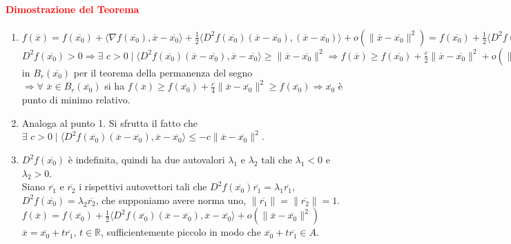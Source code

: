 \documentclass{article}
\newcommand{\R}{\mathbb{R}}
\begin{document}
\paragraph{\textcolor{red}{Dimostrazione del Teorema}}
\begin{enumerate}
    \item $f(\overline{x})=f(\overline{x_0})+\langle \nabla f(\overline{x_0}), \overline{x}-\overline{x_0} \rangle+\frac{1}{2}\langle D^2f(\overline{x_0})(\overline{x}-\overline{x_0}),(\overline{x}-\overline{x_0}) \rangle+o(\| \overline{x}-\overline{x_0} \|^2)=f(\overline{x_0})+\frac{1}{2}\langle D^2f(\overline{x_0})(\overline{x}-\overline{x_0}),(\overline{x}-\overline{x_0})\rangle+o(\|\overline{x}-\overline{x_0}\|^2)$\\
    $D^2f(\overline{x_0})>0 \Rightarrow \exists \,\, c >0 \mid \langle D^2f(\overline{x_0})(\overline{x}-\overline{x_0}),\overline{x}-\overline{x_0} \rangle \geq \|\overline{x}-\overline{x_0} \|^2\Rightarrow f(\overline{x})\geq f(\overline{x_0})+\frac{c}{2}\|\overline{x}-\overline{x_0}\|^2+o(\|\overline{x}-\overline{x_0}\|^2)=-f(\overline{x_0})+\|\overline{x}-\overline{x_0} \|^2(\frac{c}{2}+o(1))\Rightarrow \exists\,\, r>0 \mid \frac{c}{2}+o(1)\geq \frac{c}{4}$in $B_r(\overline{x_0})$ per il teorema della permanenza del segno\\
    $\Rightarrow \forall\,\, \overline{x}\in B_r(\overline{x_0})$ si ha
    $f(\overline{x})\geq f(\overline{x_0})+\frac{c}{4}\|\overline{x}-\overline{x_0}\|^2 \geq f(\overline{x_0}) \Rightarrow \overline{x_0}$ è punto di minimo relativo.
    \item Analoga al punto 1. Si sfrutta il fatto che $\exists \,\, c>0 \mid \langle D^2f(\overline{x_0})(\overline{x}-\overline{x_0}),\overline{x}-\overline{x_0} \rangle \leq -c\|\overline{x}-\overline{x_0}\|^2$.
    \item $D^2f(\overline{x_0})$ è indefinita, quindi ha due autovalori $\lambda_1$ e $\lambda_2$ tali che $\lambda_1<0$ e $\lambda_2>0$.\\
    Siano $\overline{r_1}$ e $\overline{r_2}$ i rispettivi autovettori tali che $D^2f(\overline{x_0})\overline{r_1}=\lambda_1\overline{r_1}$, $D^2f(\overline{x_0})=\lambda_2\overline{r_2}$, che supponiamo avere norma uno, $\|\overline{r_1} \|=\|\overline{r_2}\|=1$.\\
    $f(\overline{x})=f(\overline{x_0})+\frac{1}{2}\langle D^2f(\overline{x_0})(\overline{x}-\overline{x_0}),\overline{x}-\overline{x_0} \rangle + o(\|\overline{x}-\overline{x_0}\|^2)$\\
    $\overline{x}=\overline{x_0}+t\overline{r_1}$, $t \in \R$, sufficientemente piccolo in modo che $\overline{x_0}+t\overline{r_1}\in A$.\\

\end{enumerate}
\end{document}
